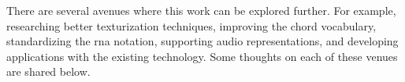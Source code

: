 
There are several avenues where this work can be explored
further. For example, researching better texturization
techniques, improving the chord vocabulary, standardizing
the \gls{rna} notation, supporting audio representations,
and developing applications with the existing technology.
Some thoughts on each of these venues are shared below.
